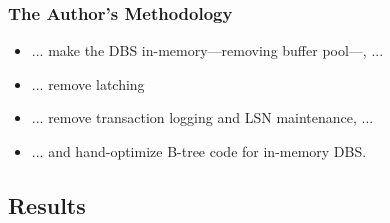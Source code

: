 \begin{frame}
    \frametitle{The Author's Methodology}
    
    \begin{itemize}
        \item<3->   ... make the DBS in-memory---removing buffer pool---, ...
        \item<4->   ... remove latching 
        \item<6->   ... remove transaction logging and LSN maintenance, ...
        \item<7->   ... and hand-optimize B-tree code for in-memory DBS.
    \end{itemize}
\end{frame}

\subsection{Results}

\frame{\subsectionpage}


